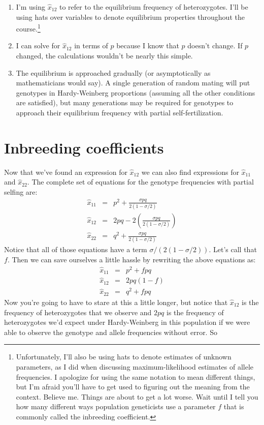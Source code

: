 \begin{enumerate}

\item I'm using $\hat x_{12}$ to refer to the equilibrium frequency of
  heterozygotes. I'll be using hats over variables to denote
  equilibrium properties throughout the
  course.\footnote{Unfortunately, I'll also be using hats to denote
    estimates of unknown parameters, as I did when discussing
    maximum-likelihood estimates of allele frequencies. I apologize
    for using the same notation to mean different things, but I'm
    afraid you'll have to get used to figuring out the meaning from
    the context. Believe me. Things are about to get a lot worse. Wait
    until I tell you how many different ways population geneticists
    use a parameter $f$ that is commonly called the inbreeding
    coefficient.}

\item I can solve for $\hat x_{12}$ in terms of $p$ because I know
  that $p$ doesn't change. If $p$ changed, the calculations wouldn't
  be nearly this simple.

\item The equilibrium is approached gradually (or asymptotically as
  mathematicians would say). A single generation of random mating will
  put genotypes in Hardy-Weinberg proportions (assuming all the other
  conditions are satisfied), but many generations may be required for
  genotypes to approach their equilibrium frequency with partial
  self-fertilization.

\end{enumerate}

\section*{Inbreeding coefficients}

Now that we've found an expression for $\hat x_{12}$ we can also find
expressions for $\hat x_{11}$ and $\hat x_{22}$. The complete set of
equations for the genotype frequencies with partial selfing are:
\begin{eqnarray}
\hat x_{11} &=& p^2 + \frac{\sigma pq}{2(1-\sigma/2)} \\
\hat x_{12} &=& 2pq - 2\left(\frac{\sigma pq}{2(1-\sigma/2)}\right) \\
\hat x_{22} &=& q^2 + \frac{\sigma pq}{2(1-\sigma/2)} 
\end{eqnarray}
Notice that all of those equations have a term
$\sigma/(2(1-\sigma/2))$. Let's call that $f$. Then we can save
ourselves a little hassle by rewriting the above equations as:
\begin{eqnarray}
\hat x_{11} &=& p^2 + fpq \\
\hat x_{12} &=& 2pq(1-f) \\
\hat x_{22} &=& q^2 + fpq
\end{eqnarray}
Now you're going to have to stare at this a little longer, but notice
that $\hat x_{12}$ is the frequency of heterozygotes that we observe
and $2pq$ is the frequency of heterozygotes we'd expect under
Hardy-Weinberg in this population if we were able to observe the
genotype and allele frequencies without error. So

